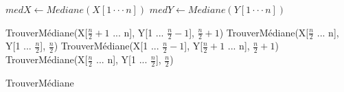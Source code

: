\documentclass[12pt]{article}
\begin{document}
\begin{algorithm}[H]
      	
      	
      	\(medX \gets Mediane(X[1 \cdot\cdot\cdot  n]) \) \;
      	\(medY \gets Mediane(Y[1 \cdot\cdot\cdot  n]) \) \;
      	
      	
      	{
      		{
      			\Return TrouverMédiane(X[\( \frac{n}{2} +1\) ...  n], Y[1 ...  \( \frac{n}{2} -1\)], \( \frac{n}{2} +1\))
      		}
      		{
      			\Return TrouverMédiane(X[\( \frac{n}{2}\) ...  n], Y[1 ...  \( \frac{n}{2}\)], \( \frac{n}{2}\))
      		}
      	}
      	{
      		{
      			\Return TrouverMédiane(X[1 ...  \( \frac{n}{2} -1\)], Y[\( \frac{n}{2} +1\) ...  n], \( \frac{n}{2} +1\))
      		}
      		{
      			\Return TrouverMédiane(X[\( \frac{n}{2}\) ...  n], Y[1 ...  \( \frac{n}{2}\)], \( \frac{n}{2}\))
      		}
      	}
      

      \caption{TrouverMédiane}
\end{algorithm}
\end{document}
